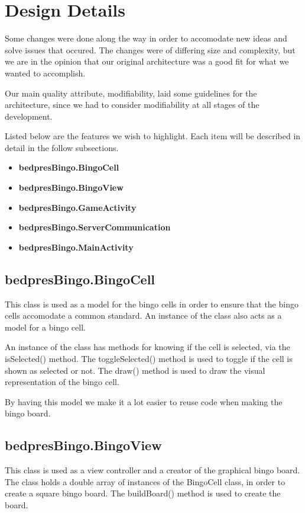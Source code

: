 \section{Design Details}
\label{designdetails}

Some changes were done along the way in order to accomodate new ideas and solve issues that occured. The changes were of differing size and complexity, but we are in the opinion that our original architecture was a good fit for what we wanted to accomplish. 

Our main quality attribute, modifiability, laid some guidelines for the architecture, since we had to consider modifiability at all stages of the development. 

Listed below are the features we wish to highlight.
Each item will be described in detail in the follow subsections.

\begin{itemize}
	\item \textbf{bedpresBingo.BingoCell} \\
	\item \textbf{bedpresBingo.BingoView} \\
	\item \textbf{bedpresBingo.GameActivity}
	\item \textbf{bedpresBingo.ServerCommunication} \\
	\item \textbf{bedpresBingo.MainActivity} \\
\end{itemize}


\subsection{bedpresBingo.BingoCell}
This class is used as a model for the bingo cells in order to ensure that the bingo cells accomodate a common standard. An instance of the class also acts as a model for a bingo cell. 

An instance of the class has methods for knowing if the cell is selected, via the isSelected() method. The toggleSelected() method is used to toggle if the cell is shown as selected or not. The draw() method is used to draw the visual representation of the bingo cell. 

By having this model we make it a lot easier to reuse code when making the bingo board.

\subsection{bedpresBingo.BingoView}
This class is used as a view controller and a creator of the graphical bingo board. The class holds a double array of instances of the BingoCell class, in order to create a square bingo board. The buildBoard() method is used to create the board. 

